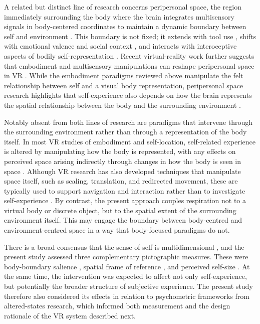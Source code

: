 A related but distinct line of research concerns peripersonal space, the region immediately surrounding the body where the brain integrates multisensory signals in body-centered coordinates to maintain a dynamic boundary between self and environment \citep{Serino2019, Bufacchi2018}. This boundary is not fixed; it extends with tool use \citep{Maravita2003}, shifts with emotional valence and social context \citep{Bufacchi2018, Serino2019}, and interacts with interoceptive aspects of bodily self-representation \citep{Tsakiris2011, Azzalini2019}. Recent virtual-reality work further suggests that embodiment and multisensory manipulations can reshape peripersonal space in VR \citep{Petrizzo2024, Karakoc2025}. While the embodiment paradigms reviewed above manipulate the felt relationship between self and a visual body representation, peripersonal space research highlights that self-experience also depends on how the brain represents the spatial relationship between the body and the surrounding environment \citep{Serino2019, Bufacchi2018}.

Notably absent from both lines of research are paradigms that intervene through the surrounding environment rather than through a representation of the body itself. In most VR studies of embodiment and self-location, self-related experience is altered by manipulating how the body is represented, with any effects on perceived space arising indirectly through changes in how the body is seen in space \citep{Guy2023}. Although VR research has also developed techniques that manipulate space itself, such as scaling, translation, and redirected movement, these are typically used to support navigation and interaction rather than to investigate self-experience \citep{abtahi2022beyond}. By contrast, the present approach couples respiration not to a virtual body or discrete object, but to the spatial extent of the surrounding environment itself. This may engage the boundary between body-centred and environment-centred space in a way that body-focused paradigms do not.

There is a broad consensus that the sense of self is multidimensional \citep{milliere2020varieties, taves2020mystical}, and the present study assessed three complementary pictographic measures. These were body-boundary salience \citep{Dambrun2016}, spatial frame of reference \citep{Hanley2019}, and perceived self-size \citep{vidal2025inducing}. At the same time, the intervention was expected to affect not only self-experience, but potentially the broader structure of subjective experience. The present study therefore also considered its effects in relation to psychometric frameworks from altered-states research, which informed both measurement and the design rationale of the VR system described next.


